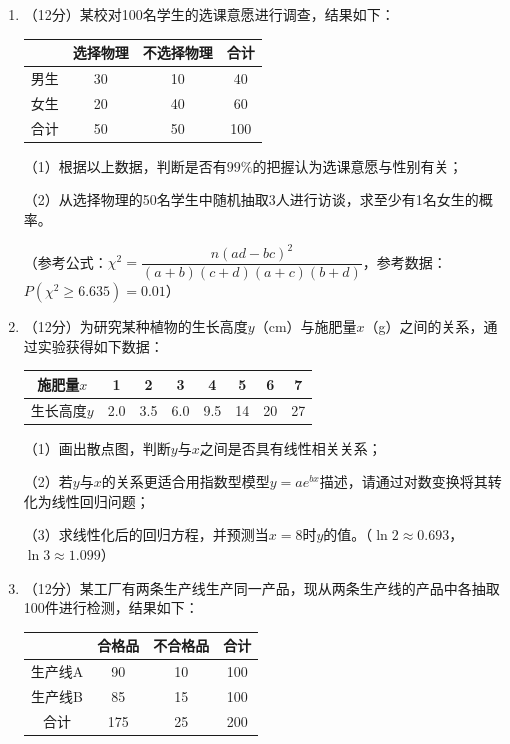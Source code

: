 \documentclass[12pt, a4paper]{ctexart}
\begin{document}
\begin{enumerate}[label=\textbf{\arabic*.}, leftmargin=2em, resume]
（1）求$y$关于$x$的回归直线方程$\hat{y} = \hat{b}x + \hat{a}$；

（2）计算决定系数$R^2$，并说明回归模型的拟合效果；

（3）当广告投入为8万元时，预测产品销售额。

\item（12分）某校对100名学生的选课意愿进行调查，结果如下：

\begin{center}
\begin{tabular}{|c|c|c|c|}
\hline
 & 选择物理 & 不选择物理 & 合计 \\
\hline
男生 & 30 & 10 & 40 \\
\hline
女生 & 20 & 40 & 60 \\
\hline
合计 & 50 & 50 & 100 \\
\hline
\end{tabular}
\end{center}

（1）根据以上数据，判断是否有$99\%$的把握认为选课意愿与性别有关；

（2）从选择物理的50名学生中随机抽取3人进行访谈，求至少有1名女生的概率。

（参考公式：$\chi^2 = \dfrac{n(ad-bc)^2}{(a+b)(c+d)(a+c)(b+d)}$，参考数据：$P(\chi^2 \geqslant 6.635) = 0.01$）

\item（12分）为研究某种植物的生长高度$y$（cm）与施肥量$x$（g）之间的关系，通过实验获得如下数据：

\begin{center}
\begin{tabular}{|c|c|c|c|c|c|c|c|}
\hline
施肥量$x$ & 1 & 2 & 3 & 4 & 5 & 6 & 7 \\
\hline
生长高度$y$ & 2.0 & 3.5 & 6.0 & 9.5 & 14 & 20 & 27 \\
\hline
\end{tabular}
\end{center}

（1）画出散点图，判断$y$与$x$之间是否具有线性相关关系；

（2）若$y$与$x$的关系更适合用指数型模型$y = ae^{bx}$描述，请通过对数变换将其转化为线性回归问题；

（3）求线性化后的回归方程，并预测当$x = 8$时$y$的值。（$\ln 2 \approx 0.693$，$\ln 3 \approx 1.099$）

\item（12分）某工厂有两条生产线生产同一产品，现从两条生产线的产品中各抽取100件进行检测，结果如下：

\begin{center}
\begin{tabular}{|c|c|c|c|}
\hline
 & 合格品 & 不合格品 & 合计 \\
\hline
生产线A & 90 & 10 & 100 \\
\hline
生产线B & 85 & 15 & 100 \\
\hline
合计 & 175 & 25 & 200 \\
\hline
\end{tabular}
\end{center}


\end{enumerate}
\end{document}
